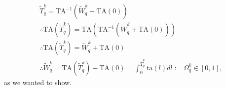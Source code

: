 \documentclass[hidelinks, nonatbib]{elsarticle}
\begin{document}
    \begin{align}
        &\tilde{T}_{q}^{k}
        =
        \text{TA}^{-1}
        \left(
            \tilde{W}_{q}^{k}
            +
            \text{TA}(0)
        \right)
        \\
        &
        \therefore
        \text{TA}
        (
            \tilde{T}_{q}^{k}
        )
        =
        \text{TA}
        \left(
            \text{TA}^{-1}
            \left(
                \tilde{W}_{q}^{k}
                +
                \text{TA}(0)
            \right)
        \right)
        \\
        &
        \therefore
        \text{TA}
        (
            \tilde{T}_{q}^{k}
        )
        =
        \tilde{W}_{q}^{k}
        +
        \text{TA}(0)
        \\
        &
        \therefore
        \tilde{W}_{q}^{k}
        =
        \text{TA}
        (
            \tilde{T}_{q}^{k}
        )
        -
        \text{TA}(0)
        =
        \int_{0}^{\tilde{T}_{q}^{k}}
        \text{ta}(l)
        dl
        :=
        \Omega_{q}^{k}
        \in 
        [0,1]
        ,
    \end{align}
    as we wanted to show.
    
\end{document}
